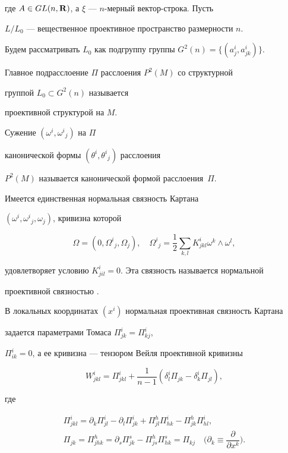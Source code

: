 где $A \in GL(n, {\bold R})$, а $\xi$ --- $n$-мерный вектор-строка. Пусть


$L/L_0$ --- вещественное проективное пространство размерности $n$.


Будем рассматривать $L_0$ как подгруппу группы $G^2(n)=\{(a^i_j,a^i_{jk})\}$.


Главное подрасслоение $\Pi $ расслоения $P^{2}(M)$ со структурной


группой $L_{0} \subset G^{2}(n)$ называется


проективной структурой на $M$. 


Сужение $(\omega^i,\omega^i{}_j)$ на $\Pi$


канонической формы $(\theta^i,\theta^i{}_j)$ расслоения


$P^2(M)$ называется канонической формой расслоения~$\Pi$.





Имеется единственная нормальная связность Картана


$(\omega^i,\omega^i{}_j,\omega_j)$, кривизна которой


$$


\Omega =(0,\Omega^i{}_j,\Omega _j), \quad


\Omega^i{}_j=\frac12 \sum _{k,l} K^i_{jkl}\omega^k \wedge\omega ^l,


$$


удовлетворяет условию $K^i_{jil}=0$. Эта связность называется нормальной 


проективной связностью \cite{Cartan_24}.


В локальных координатах $(x^i)$ нормальная проективная связность Картана


задается { параметрами Томаса} $\Pi^i_{jk}=\Pi^i_{kj}$,


$\Pi^i_{ik}=0$, а ее кривизна --- тензором Вейля проективной кривизны


\begin{equation}\label{tenWey}


W^i_{jkl}=\Pi^i_{jkl}+\frac{1}{n-1}(\delta


^i_l\Pi_{jk}-\delta^i_k\Pi_{jl}),


\end{equation}


где


\begin{equation}\label{tenWey1}\begin{array}{c}


\Pi^i_{jkl}=\partial_k\Pi^i_{jl}-\partial_l\Pi^i_{jk}+\Pi^h_{jl}


\Pi^i_{hk}-\Pi^h_{jk}\Pi^i_{hl},\\[3mm]


\Pi_{jk}=\Pi^h_{jhk} =


\partial_s\Pi^s_{jk}-\Pi^h_{js}\Pi^s_{hk}=\Pi_{kj}


\quad \bigg(\partial_k\equiv\dfrac{\partial}{\partial x^k}\bigg).


\end{array}\end{equation}


